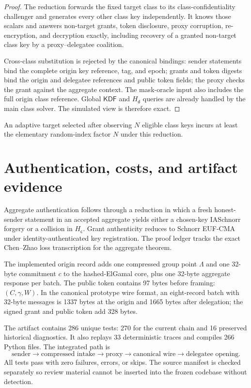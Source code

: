 \documentclass[11pt,letterpaper]{article}
\theoremstyle{definition}
\theoremstyle{remark}
\newcommand{\KDF}{\ensuremath{\mathsf{KDF}}}
\newcommand{\Hd}{\ensuremath{H_{\mathsf d}}}
\newcommand{\Hc}{\ensuremath{H_{\mathsf c}}}
\begin{document}
\begin{proof}
The reduction forwards the fixed target class to its class-confidentiality challenger and
generates every other class key independently.  It knows those scalars and answers
non-target grants, token disclosure, proxy corruption, re-encryption, and
decryption exactly, including recovery of a granted non-target class key by a
proxy--delegatee coalition.

Cross-class substitution is rejected by the canonical bindings: sender statements
bind the complete origin key reference, tag, and epoch; grants and token digests
bind the origin and delegatee references and public token fields; the proxy checks
the grant against the aggregate context.  The mask-oracle input also includes the
full origin class reference.  Global \(\KDF\) and \(\Hd\) queries are already
handled by the main class solver.  The simulated view is therefore exact.
\end{proof}

An adaptive target selected after observing \(N\) eligible class keys incurs at
least the elementary random-index factor \(N\) under this reduction.

\section{Authentication, costs, and artifact evidence}
\label{sec:artifact}

Aggregate authentication follows through a reduction in which a fresh
honest-sender statement in an accepted aggregate yields either a chosen-key
IASchnorr forgery or a collision in \(\Hc\).  Grant authenticity reduces to
Schnorr EUF-CMA under identity-authenticated key registration.  The proof ledger
tracks the exact Chen--Zhao loss transcription for the aggregate theorem.

The implemented origin record adds one compressed group point \(\Lambda\) and one
32-byte commitment \(c\) to the hashed-ElGamal core, plus one 32-byte aggregate
response per batch.  The public token contains 97 bytes before framing:
\((C,\gamma,W)\).  In the canonical prototype wire format, an eight-record batch
with 32-byte messages is 1337 bytes at the origin and 1665 bytes after delegation;
the signed grant and public token add 328 bytes.

The artifact contains 286 unique tests: 270 for the current chain and 16 preserved
historical diagnostics.  It also replays 33 deterministic traces and compiles 266
Python files.  The integrated path is
\[
 \text{sender}\to\text{compressed intake}\to\text{proxy}
 \to\text{canonical wire}\to\text{delegatee opening}.
\]
All tests pass with zero failures, errors, or skips.  The source manifest is
checked separately so review material cannot be inserted into the frozen codebase
without detection.
\end{document}
